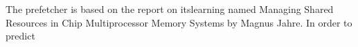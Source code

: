 

The prefetcher is based on the report on itslearning named Managing Shared Resources in Chip Multiprocessor Memory Systems by Magnus Jahre. In order to predict
